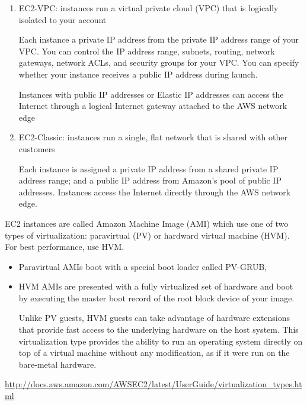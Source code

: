 \begin{enumerate}
  \item EC2-VPC: instances run a virtual private cloud (VPC) that is logically
  isolated to your account
  
   Each instance a private IP address from the private IP address range of your
  VPC. You can control the IP address range, subnets, routing, network gateways,
  network ACLs, and security groups for your VPC. You can specify whether your
  instance receives a public IP address during launch.
  
  Instances with public IP addresses or Elastic IP addresses can access the
  Internet through a logical Internet gateway attached to the AWS network edge
  
  \item EC2-Classic: instances run a single, flat network that is shared with
  other customers
  
  Each instance is assigned a private IP address from a shared private IP
  address range; and a public IP address from Amazon's pool of public IP
  addresses. Instances access the Internet directly through the AWS network
  edge.
    
\end{enumerate}

EC2 instances are called Amazon Machine Image (AMI) which use one of two types
of virtualization: paravirtual (PV) or hardward virtual machine (HVM). For best
performance, use HVM.
\begin{itemize}
  \item Paravirtual AMIs boot with a special boot loader called PV-GRUB,
  \item HVM AMIs are presented with a fully virtualized set of hardware and boot
  by executing the master boot record of the root block device of your image. 
  
  Unlike PV guests, HVM guests can take advantage of hardware extensions that
  provide fast access to the underlying hardware on the host system.  This
  virtualization type provides the ability to run an operating system directly
  on top of a virtual machine without any modification, as if it were run on the
  bare-metal hardware.
  
\end{itemize}
\url{http://docs.aws.amazon.com/AWSEC2/latest/UserGuide/virtualization_types.html}

